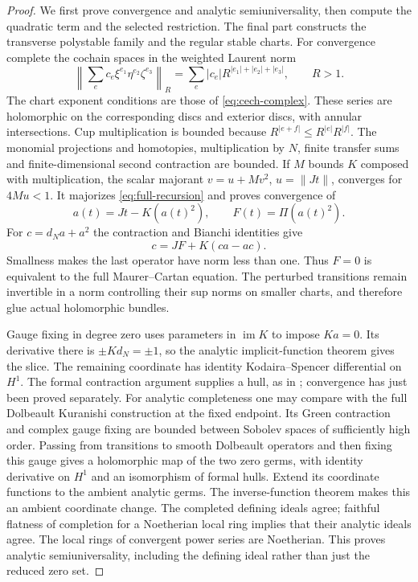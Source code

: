 \documentclass[11pt]{amsart}
\theoremstyle{definition}
\theoremstyle{remark}
\newcommand{\im}{\operatorname{im}}
\begin{document}
\begin{proof}
We first prove convergence and analytic semiuniversality, then compute the
quadratic term and the selected restriction. The final part constructs
the transverse polystable family and the regular stable charts.
For convergence complete the cochain spaces in the weighted Laurent norm
\[
 \left\|\sum_e c_e\xi^{e_1}\eta^{e_2}\zeta^{e_3}\right\|_R
 =\sum_e|c_e|R^{|e_1|+|e_2|+|e_3|},\qquad R>1.
\]
The chart exponent conditions are those of \eqref{eq:cech-complex}.
These series are holomorphic on the corresponding discs and exterior
discs, with annular intersections. Cup multiplication is bounded because
$R^{|e+f|}\le R^{|e|}R^{|f|}$. The monomial projections and homotopies,
multiplication by $N$, finite transfer sums and finite-dimensional second
contraction are bounded. If $M$ bounds $K$ composed with multiplication,
the scalar majorant $v=u+Mv^2$, $u=\|Jt\|$, converges for $4Mu<1$.
It majorizes \eqref{eq:full-recursion} and proves convergence of
\begin{equation}\label{eq:endpoint-fixedpoint}
 a(t)=Jt-K(a(t)^2),\qquad F(t)=\Pi(a(t)^2).
\end{equation}
For $c=d_Na+a^2$ the contraction and Bianchi identities give
\[
 c=JF+K(ca-ac).
\]
Smallness makes the last operator have norm less than one. Thus $F=0$
is equivalent to the full Maurer--Cartan equation. The perturbed
transitions remain invertible in a norm controlling their sup norms on
smaller charts, and therefore glue actual holomorphic bundles.

Gauge fixing in degree zero uses parameters in $\im K$ to impose
$Ka=0$. Its derivative there is $\pm Kd_N=\pm1$, so the analytic
implicit-function theorem gives the slice. The remaining coordinate has
identity Kodaira--Spencer differential on $H^1$. The formal contraction
argument supplies a hull, as in \cite[Proposition~4.6 and Theorem~4.7]{manetti2005};
convergence has just been proved separately.
For analytic completeness one may compare with the full Dolbeault
Kuranishi construction at the fixed endpoint. Its Green contraction and
complex gauge fixing are bounded between Sobolev spaces of sufficiently
high order. Passing from transitions to smooth Dolbeault operators and
then fixing this gauge gives a holomorphic map of the two zero germs,
with identity derivative on $H^1$ and an isomorphism of formal hulls.
Extend its coordinate functions to the ambient analytic germs. The
inverse-function theorem makes this an ambient coordinate change.
The completed defining ideals agree; faithful flatness of completion
for a Noetherian local ring \cite[Tag~00MC]{stacks} implies that their
analytic ideals agree. The local rings of convergent power series are
Noetherian. This proves analytic semiuniversality, including the defining
ideal rather than just the reduced zero set.


\end{proof}
\end{document}
